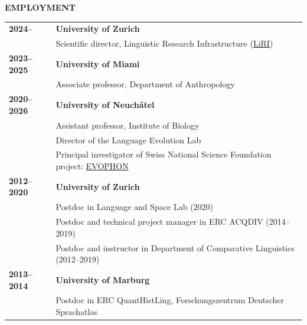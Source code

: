 \documentclass[11pt]{article}
\begin{document}
\vskip 12pt
\begin{flushleft}
{\bf EMPLOYMENT}
\end{flushleft}
\begin{tabular}{lp{5.5in}}

\bf 2024-- & {\bf University of Zurich} \\
& Scientific director, Linguistic Research Infrastructure (\href{https://www.liri.uzh.ch/}{LiRI}) \\

\bf 2023--2025 & {\bf University of Miami} \\
& Associate professor, Department of Anthropology \\

\bf 2020--2026 & {\bf University of Neuchâtel} \\
& Assistant professor, Institute of Biology \\
& Director of the Language Evolution Lab \\
& Principal investigator of Swiss National Science Foundation project: \href{https://data.snf.ch/grants/grant/186841}{EVOPHON} \\


\bf 2012--2020 & {\bf University of Zurich} \\

& Postdoc in Language and Space Lab (2020) \\
& Postdoc and technical project manager in ERC ACQDIV (2014--2019) \\
& Postdoc and instructor in Department of Comparative Linguistics (2012--2019) \\

\bf 2013--2014 & {\bf University of Marburg} \\
& Postdoc in ERC QuantHistLing, Forschungszentrum Deutscher Sprachatlas \\


\end{tabular}
\end{document}
